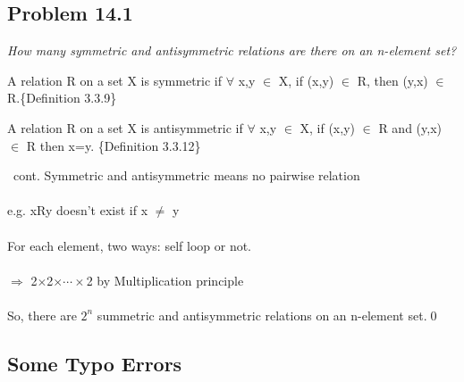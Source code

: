 \documentclass[handout]{beamer}
\begin{document}
        
        
    \subsection{Problem 14.1}
    
        \begin{frame}[c,shrink]{\subsecname}
            \textit{How many symmetric and antisymmetric relations are there on an n-element
set?}\\\pause
                \begin{definition}
			    A relation R on a set X is \alert{symmetric} if $\forall$ x,y $\in$ X, if (x,y) $\in$ R, then (y,x) $\in$ R.\{Definition 3.3.9\}
                \end{definition}\pause
                \begin{definition}
			    A relation R on a set X is \alert{antisymmetric} if $\forall$ x,y $\in$ X, if (x,y) $\in$ R and (y,x) $\in$ R then x=y. \{Definition 3.3.12\}
                \end{definition}
        \end{frame}
    
        \begin{frame}[c]{\subsecname\ cont.}
            Symmetric and antisymmetric means \alert{no pairwise relation}\\$\;$\\\pause
            e.g. xRy doesn't exist if x $\neq$ y\\$\;$\\\pause
            For each element, two ways: self loop or not.\\$\;$\\\pause
            $\Rightarrow$ 2$\times$2$\times\cdots\times$2 by Multiplication principle\\$\;$\\\pause
            So, there are $2^n$ summetric and antisymmetric relations on an n-element set.\qed
        \end{frame}
        
        
        
\subsection{Some Typo Errors}
\end{document}
